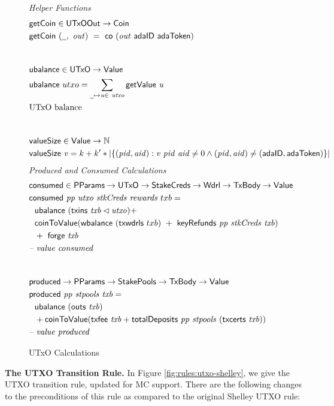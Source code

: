 \begin{figure}[htb]
  \emph{Helper Functions}
  \begin{align*}
    & \fun{getCoin} \in \UTxOOut \to \Coin \\
    & \fun{getCoin}~{(\wcard,~\var{out})} ~=~\fun{co}~(\var{out}~\mathsf{adaID}~\mathsf{adaToken}) \\
    \nextdef
    & \fun{ubalance} \in \UTxO \to \Value \\
    & \fun{ubalance} ~ utxo = \sum_{\wcard\mapsto\var{u}\in~\var{utxo}}
    \fun{getValue}~\var{u} \\
    & \text{UTxO balance} \\
    \nextdef
    & \fun{valueSize} \in \Value \to \N \\
    & \fun{valueSize}~\var{v} = k + k' * |\{ (\var{pid}, \var{aid}) : \var{v}~\var{pid}~\var{aid} \neq 0
      \land (\var{pid}, \var{aid}) \neq (\mathsf{adaID}, \mathsf{adaToken}) \}|
  \end{align*}
  \emph{Produced and Consumed Calculations}
  \begin{align*}
    & \fun{consumed} \in \PParams \to \UTxO \to \StakeCreds \to \Wdrl \to \TxBody \to \Value \\
    & \consumed{pp}{utxo}{stkCreds}{rewards}~{txb} = \\
    & ~~\ubalance{(\txins{txb} \restrictdom \var{utxo})} + \\
    &~~  \fun{coinToValue}(\fun{wbalance}~(\fun{txwdrls}~{txb})~+~ \keyRefunds{pp}{stkCreds}{txb}) \\
    &~~+~\fun{forge}~\var{txb} \\
    & \text{\emph{-- value consumed}} \\
    \nextdef
    & \fun{produced} \to \PParams \to \StakePools \to \TxBody \to \Value \\
    & \fun{produced}~\var{pp}~\var{stpools}~\var{txb} = \\
    &~~\ubalance{(\fun{outs}~{txb})} \\
    &~~+ \fun{coinToValue}(\txfee{txb} + \totalDeposits{pp}{stpools}{(\txcerts{txb})})\\
    & \text{\emph{-- value produced}} \\
  \end{align*}
  \caption{UTxO Calculations}
  \label{fig:functions:utxo}
\end{figure}

\clearpage

\textbf{The UTXO Transition Rule.}
In Figure \ref{fig:rules:utxo-shelley}, we give the UTXO transition rule,
updated for MC support. There are the following changes to the preconditions
of this rule as compared to the original Shelley UTXO rule:

